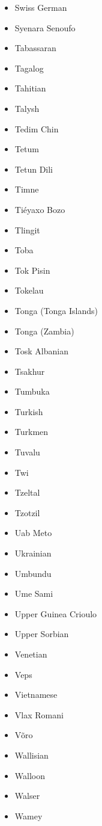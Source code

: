 \documentclass[paper=a4, 12pt]{scrbook}
\begin{document}
\begin{multicols}{3}
\begin{itemize}
        \item Swiss German
        \item Syenara Senoufo
        \item Tabassaran
        \item Tagalog
        \item Tahitian
        \item Talysh
        \item Tedim Chin
        \item Tetum
        \item Tetun Dili
        \item Timne
        \item Tiéyaxo Bozo
        \item Tlingit
        \item Toba
        \item Tok Pisin
        \item Tokelau
        \item Tonga (Tonga Islands)
        \item Tonga (Zambia)
        \item Tosk Albanian
        \item Tsakhur
        \item Tumbuka
        \item Turkish
        \item Turkmen
        \item Tuvalu
        \item Twi
        \item Tzeltal
        \item Tzotzil
        \item Uab Meto
        \item Ukrainian
        \item Umbundu
        \item Ume Sami
        \item Upper Guinea Crioulo
        \item Upper Sorbian
        \item Venetian
        \item Veps
        \item Vietnamese
        \item Vlax Romani
        \item Võro
        \item Wallisian
        \item Walloon
        \item Walser
        \item Wamey

\end{itemize}
\end{multicols}
\end{document}
